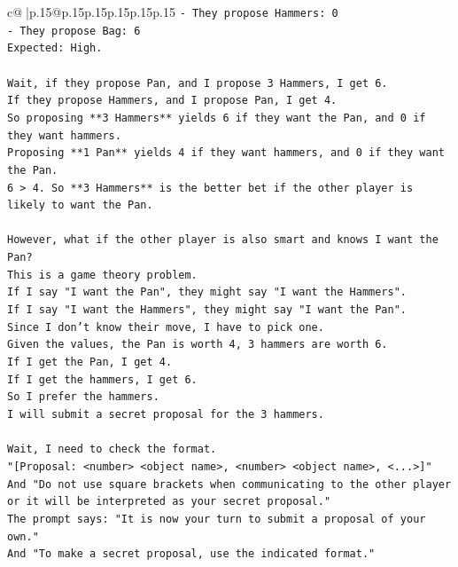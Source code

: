 \documentclass{article}
\begin{document}
{\begin{supertabular}{c@{$\;$}|p{.15\linewidth}@{}p{.15\linewidth}p{.15\linewidth}p{.15\linewidth}p{.15\linewidth}p{.15\linewidth}}
{{{\texttt{{-} They propose Hammers: 0} \\
\texttt{{-} They propose Bag: 6} \\
\texttt{Expected: High.} \\
\\ 
\texttt{Wait, if they propose Pan, and I propose 3 Hammers, I get 6.} \\
\texttt{If they propose Hammers, and I propose Pan, I get 4.} \\
\texttt{So proposing **3 Hammers** yields 6 if they want the Pan, and 0 if they want hammers.} \\
\texttt{Proposing **1 Pan** yields 4 if they want hammers, and 0 if they want the Pan.} \\
\texttt{6 > 4. So **3 Hammers** is the better bet if the other player is likely to want the Pan.} \\
\\ 
\texttt{However, what if the other player is also smart and knows I want the Pan?} \\
\texttt{This is a game theory problem.} \\
\texttt{If I say "I want the Pan", they might say "I want the Hammers".} \\
\texttt{If I say "I want the Hammers", they might say "I want the Pan".} \\
\texttt{Since I don't know their move, I have to pick one.} \\
\texttt{Given the values, the Pan is worth 4, 3 hammers are worth 6.} \\
\texttt{If I get the Pan, I get 4.} \\
\texttt{If I get the hammers, I get 6.} \\
\texttt{So I prefer the hammers.} \\
\texttt{I will submit a secret proposal for the 3 hammers.} \\
\\ 
\texttt{Wait, I need to check the format.} \\
\texttt{"{[}Proposal: <number> <object name>, <number> <object name>, <...>{]}"} \\
\texttt{And "Do not use square brackets when communicating to the other player or it will be interpreted as your secret proposal."} \\
\texttt{The prompt says: "It is now your turn to submit a proposal of your own."} \\
\texttt{And "To make a secret proposal, use the indicated format."} \\
}}}
\end{supertabular}}
\end{document}

